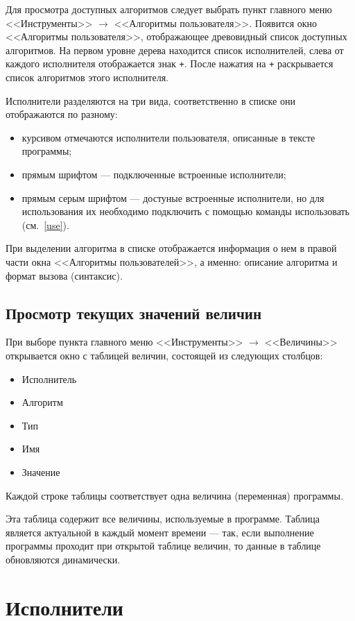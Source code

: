 \documentclass[12pt,a4paper]{article}
\begin{document}
Для просмотра доступных алгоритмов следует выбрать пункт главного меню <<Инструменты>> $\to$ <<Алгоритмы пользователя>>. Появится окно <<Алгоритмы пользователя>>, отображающее древовидный список доступных алгоритмов. На первом уровне дерева находится список исполнителей, слева от каждого исполнителя отображается знак \texttt{+}. После нажатия на \texttt{+} раскрывается список алгоритмов этого исполнителя.

Исполнители разделяются на три вида, соответственно в списке они отображаются по разному:
\begin{itemize}
\item курсивом отмечаются исполнители пользователя, описанные в тексте программы;
\item прямым шрифтом --- подключенные встроенные исполнители;
\item прямым серым шрифтом --- достуные встроенные исполнители, но для использования их необходимо подключить с помощью команды \textsf{использовать} (см.~\ref{use}).
\end{itemize}

При выделении алгоритма в списке отображается информация о нем в правой части окна <<Алгоритмы пользователей>>, а именно: описание алгоритма и формат вызова (синтаксис).

\subsection{Просмотр текущих значений величин}
\label{debugtable}

При выборе пункта главного меню <<Инструменты>> $\to$ <<Величины>> открывается окно с таблицей величин, состоящей из следующих столбцов:
\begin{itemize}
\item Исполнитель
\item Алгоритм
\item Тип
\item Имя
\item Значение
\end{itemize}

Каждой строке таблицы соответствует одна величина (переменная) программы.

Эта таблица содержит все величины, используемые в программе. Таблица является актуальной в каждый момент времени --- так, если выполнение программы проходит при открытой таблице величин, то данные в таблице обновляются динамически.

\section{Исполнители}
\end{document}
